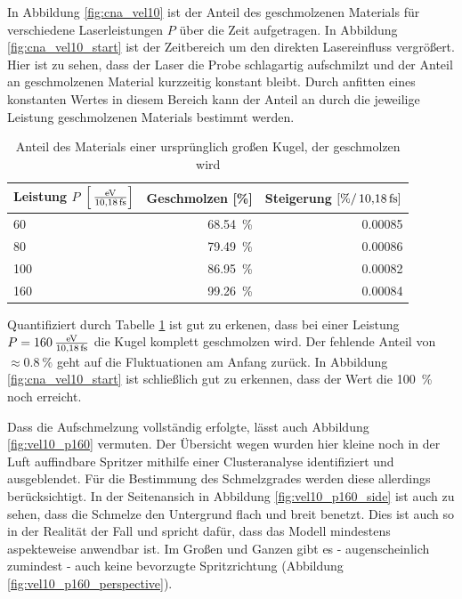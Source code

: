 		In Abbildung \ref{fig:cna_vel10} ist der Anteil des geschmolzenen Materials für
		verschiedene Laserleistungen $P$ über die Zeit aufgetragen. In Abbildung
		\ref{fig:cna_vel10_start} ist der Zeitbereich um den direkten Lasereinfluss vergrößert.
		Hier ist zu sehen, dass der Laser die Probe schlagartig aufschmilzt und der Anteil an
		geschmolzenen Material kurzzeitig konstant bleibt. Durch anfitten eines konstanten Wertes
		in diesem Bereich kann der Anteil an durch die jeweilige Leistung geschmolzenen Materials
		bestimmt werden.

		\begin{table}[!ht]
			\centering
			\caption{Anteil des Materials einer ursprünglich großen Kugel,
			der geschmolzen wird}
			\begin{tabular}{l | r | r}
				Leistung $P$ $\left[\powerunit\right]$
					&	Geschmolzen [\%]
					&	Steigerung $\left[\si{\percent\per\timeunit}\right]$
					\\\hline
				60	&	\SI{68.54}{\percent}	&	0.00085	\\
				80	&	\SI{79.49}{\percent}	&	0.00086	\\
				100	&	\SI{86.95}{\percent}	&	0.00082	\\
				160	&	\SI{99.26}{\percent}	&	0.00084
			\end{tabular}
			\label{tab:vel10_start}
		\end{table}

		Quantifiziert durch Tabelle \ref{tab:vel10_start} ist gut zu erkenen, dass bei einer
		Leistung $P = \powerunit[160]$ die Kugel komplett geschmolzen wird. Der
		fehlende Anteil von $\approx \SI{0.8}{\percent}$ geht auf die Fluktuationen am Anfang
		zurück. In Abbildung \ref{fig:cna_vel10_start} ist schließlich gut zu erkennen, dass der
		Wert die \SI{100}{\percent} noch erreicht.

		Dass die Aufschmelzung vollständig erfolgte, lässt auch Abbildung \ref{fig:vel10_p160}
		vermuten. Der Übersicht wegen wurden hier kleine noch in der Luft auffindbare Spritzer
		mithilfe einer Clusteranalyse identifiziert und ausgeblendet. Für die Bestimmung des
		Schmelzgrades werden diese allerdings berücksichtigt. In der Seitenansich in Abbildung
		\ref{fig:vel10_p160_side} ist auch zu sehen, dass die Schmelze den Untergrund flach und
		breit benetzt. Dies ist auch so in der Realität der Fall \cite{eskandarisabzi2019defect}
		und spricht dafür, dass das Modell mindestens aspekteweise anwendbar ist. Im Großen und
		Ganzen gibt es - augenscheinlich zumindest - auch keine bevorzugte Spritzrichtung
		(Abbildung \ref{fig:vel10_p160_perspective}).

